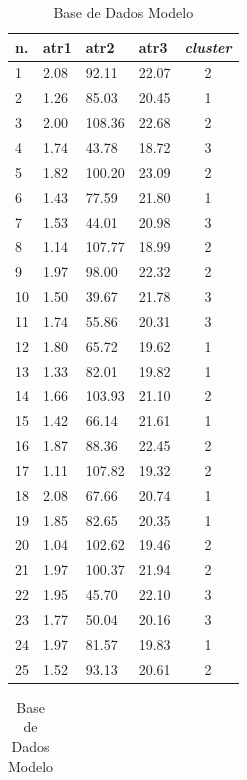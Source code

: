 \begin{table}[!ht]
\centering
\caption{Base de Dados Modelo}
\label{tab:bdm}
\begin{tabular}{|l|l|l|l|c|}
\hline 
 n. & atr1 & atr2 & atr3 & \textit{cluster} \\ \hline
1 & 2.08 & 92.11 & 22.07 & 2 \\ \hline
2 & 1.26 & 85.03 & 20.45 & 1 \\ \hline
3 & 2.00 & 108.36 & 22.68 & 2 \\ \hline
4 & 1.74 & 43.78 & 18.72 & 3 \\ \hline
5 & 1.82 & 100.20 & 23.09 & 2 \\ \hline
6 & 1.43 & 77.59 & 21.80 & 1 \\ \hline
7 & 1.53 & 44.01 & 20.98 & 3 \\ \hline
8 & 1.14 & 107.77 & 18.99 & 2 \\ \hline
9 & 1.97 & 98.00 & 22.32 & 2 \\ \hline
10 & 1.50 & 39.67 & 21.78 & 3 \\ \hline
11 & 1.74 & 55.86 & 20.31 & 3 \\ \hline
12 & 1.80 & 65.72 & 19.62 & 1 \\ \hline
13 & 1.33 & 82.01 & 19.82 & 1 \\ \hline
14 & 1.66 & 103.93 & 21.10 & 2 \\ \hline
15 & 1.42 & 66.14 & 21.61 & 1 \\ \hline
16 & 1.87 & 88.36 & 22.45 & 2 \\ \hline
17 & 1.11 & 107.82 & 19.32 & 2 \\ \hline
18 & 2.08 & 67.66 & 20.74 & 1 \\ \hline
19 & 1.85 & 82.65 & 20.35 & 1 \\ \hline
20 & 1.04 & 102.62 & 19.46 & 2 \\ \hline
21 & 1.97 & 100.37 & 21.94 & 2 \\ \hline
22 & 1.95 & 45.70 & 22.10 & 3 \\ \hline
23 & 1.77 & 50.04 & 20.16 & 3 \\ \hline
24 & 1.97 & 81.57 & 19.83 & 1 \\ \hline
25 & 1.52 & 93.13 & 20.61 & 2 \\ \hline
  \end{tabular}
  \begin{tabular}{ |l|l|l|l|c| }
   

\end{tabular}
\end{table}
